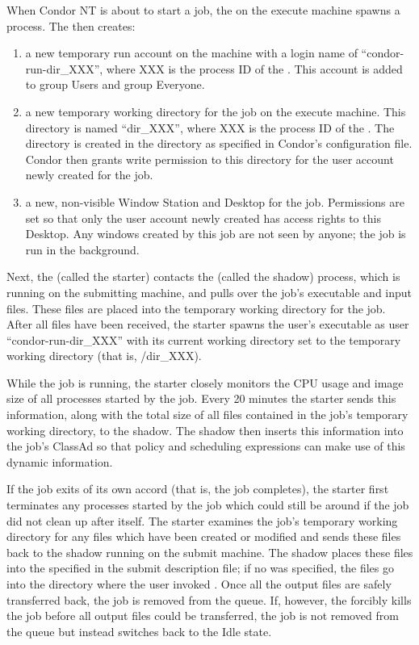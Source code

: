 When Condor NT is about to start a job, the  on the execute
machine spawns a  process.  The  then
creates:
\begin{enumerate}

\item a new temporary run account on the machine with a login name of
``condor-run-dir\_XXX'', where XXX is the process ID of the
.  This account is added to group Users and group Everyone.

\item a new temporary working directory for the job on the execute machine.
This directory is
named ``dir\_XXX'', where XXX is the process ID of the .
The directory is created in the  directory as
specified in Condor's configuration file.  Condor then grants write
permission to this directory for the user account newly created for the
job.

\item a new, non-visible Window Station and Desktop for the job.
Permissions are set so that only the
user account newly created has access rights to this Desktop.  Any windows
created by this job are not seen by anyone; the job is run in the
background.

\end{enumerate}

Next, the  (called the starter) contacts the 
(called the shadow) process, which is
running on the submitting machine, and pulls over the job's executable and
input files.
These files are placed into the temporary working directory for the job.
After all files have been received,
the starter spawns the user's executable as user ``condor-run-dir\_XXX''
with its current working directory set to the temporary working directory
(that is, /dir\_XXX).

While the job is running, the starter closely monitors the CPU
usage and image size of all processes started by the job.
Every 20 minutes the starter sends this information,
along with the total size of all files contained in the job's
temporary working directory, to the shadow.
The shadow then
inserts this information into the job's ClassAd so that policy and
scheduling expressions can make use of this dynamic information.

If the job exits of its own accord (that is, the job completes),
the starter
first terminates any processes started by the job which could still be
around if the job did not clean up after itself.
The starter examines the job's temporary working directory for any
files which have been created or modified and sends these files back
to the shadow running on the submit machine.
The shadow
places these files into the  specified in the
submit description file; if no  was specified, the files go
into the directory where the user invoked .
Once all the output files are safely transferred back,
the job is removed from the queue.
If, however, the  forcibly kills the job before all output files
could be transferred, the job is not removed from the queue but instead
switches back to the Idle state.  

